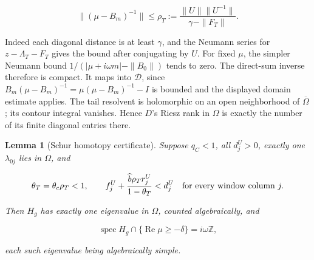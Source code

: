 \documentclass[11pt]{article}
\newtheorem{lemma}{Lemma}[section]
\theoremstyle{definition}
\begin{document}
\[
 \|(\mu-B_m)^{-1}\|\le
 \rho_T:=\frac{\|U\|\|U^{-1}\|}{\gamma-\|F_T\|}.
\]

Indeed each diagonal distance is at least $\gamma$, and the Neumann series for $z-\Lambda_T-F_T$ gives the bound after conjugating by $U$. For fixed $\mu$, the simpler Neumann bound $1/(|\mu+i\omega m|-\|B_0\|)$ tends to zero. The direct-sum inverse therefore is compact. It maps into $\mathcal D$, since $B_m(\mu-B_m)^{-1}=\mu(\mu-B_m)^{-1}-I$ is bounded and the displayed domain estimate applies. The tail resolvent is holomorphic on an open neighborhood of $\overline\Omega$; its contour integral vanishes. Hence $D$'s Riesz rank in $\Omega$ is exactly the number of its finite diagonal entries there.

\begin{lemma}[Schur homotopy certificate]\label{lem:cg-9-1} Suppose $q_C<1$, all $d_j^U>0$, exactly one $\lambda_{0j}$ lies in $\Omega$, and

\[
 \theta_T=\theta_c\rho_T<1,\qquad
 f_j^U+\frac{\widehat b\rho_T r_j^U}{1-\theta_T}<d_j^U
 \quad\hbox{for every window column }j.
\]

Then $H_g$ has exactly one eigenvalue in $\Omega$, counted algebraically, and

\[
 \operatorname{spec}H_g\cap\{\operatorname{Re}\mu\ge-\delta\}
 =i\omega\mathbb Z,
\]

each such eigenvalue being algebraically simple.

\end{lemma}
\end{document}
